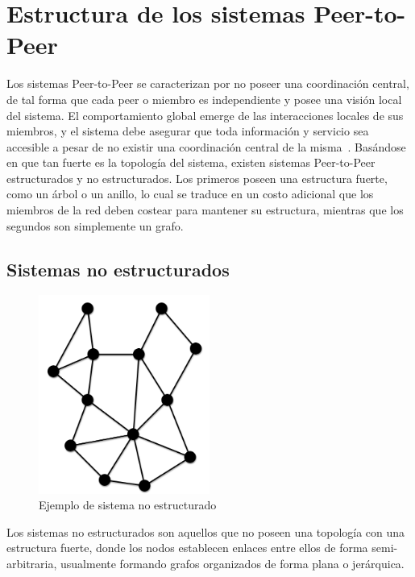 \section{Estructura de los sistemas Peer-to-Peer}
\label{sec:p2p_estructure}

Los sistemas Peer-to-Peer se caracterizan por no poseer una coordinación
central, de tal forma que cada peer o miembro es independiente y posee una visión
local del sistema. El comportamiento global emerge de las interacciones locales
de sus miembros, y el sistema debe asegurar que toda información y servicio sea
accesible a pesar de no existir una coordinación central de la
misma~\cite{Aberer:2001:PIS:503271.503268}.
Basándose en que tan fuerte es la topología del sistema, existen sistemas Peer-to-Peer estructurados y no estructurados. Los primeros
poseen una estructura fuerte, como un árbol o un anillo, lo
cual se traduce en un costo adicional que los miembros de la red deben costear
para mantener su estructura, mientras que los segundos son simplemente un
grafo.

\subsection{Sistemas no estructurados}
\label{sec:p2p_unstructured}

\begin{figure}
\center
\includegraphics[width=0.5\textwidth]{img/p2p-unstructured}
\caption{Ejemplo de sistema no estructurado}
\label{fig:p2p_unstructured}
\end{figure}

Los sistemas no estructurados son aquellos que no poseen una topología con una
estructura fuerte, donde los nodos establecen enlaces entre ellos de forma
semi-arbitraria, usualmente formando grafos organizados de forma plana o jerárquica.

